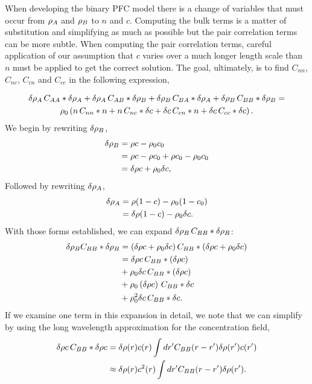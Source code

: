 When developing the binary PFC model there is a change of variables that must
occur from $\rho_A$ and $\rho_B$ to $n$ and $c$. Computing the bulk terms is a matter
of substitution and simplifying as much as possible but the pair correlation
terms can be more subtle. When computing the pair correlation terms, careful
application of our assumption that $c$ varies over a much longer length scale
than $n$ must be applied to get the correct solution. The goal, ultimately, is
to find $C_{n n}$, $C_{n c}$, $C_{c n}$ and $C_{c c}$ in the following
expression, 

\begin{gather}\label{1}
  \delta \rho_A \,C_{AA} \ast \delta \rho_A + \delta \rho_A \,C_{AB} \ast \delta \rho_B + \delta \rho_B \,C_{BA} \ast \delta \rho_A + \delta \rho_B \,C_{BB} \ast \delta \rho_B = \\ \nonumber
  \rho_0 \left(n \,C_{nn} \ast n + n \,C_{nc} \ast \delta c + \delta c \,C_{cn}\ast n + \delta c \,C_{cc} \ast \delta c\right).
\end{gather}
We begin by rewriting $\delta \rho_B$,
%
\begin{align*}
  \delta \rho_B &= \rho c - \rho_0 c_0 \\
        &= \rho c - \rho c_0 + \rho c_0 - \rho_0 c_0 \\
        &= \delta \rho c + \rho_0 \delta c,
\end{align*}
%
Followed by rewriting $\delta \rho_A$,
%
\begin{align*}
  \delta \rho_A &= \rho (1 - c) - \rho_0 (1 - c_0) \\
        &= \delta \rho (1 - c) - \rho_0 \delta c.
\end{align*}
%
With those forms established, we can expand $\delta \rho_B \,C_{BB} \ast \delta \rho_B$:
%
\begin{align}\label{this}
  \delta \rho_B C_{BB} \ast \delta \rho_B &= \left(\delta \rho c + \rho_0 \delta c \right) C_{BB} \ast \left(\delta \rho c + \rho_0 \delta c\right) \nonumber\\
                          &= \delta \rho c \,C_{BB} \ast \left( \delta \rho c\right) \nonumber\\
                          &+ \rho_0 \delta c \,C_{BB} \ast \left( \delta \rho c \right) \\
                          &+ \rho_0 \left(\delta \rho c\right) \,C_{BB} \ast \delta c \nonumber\\
                          &+ \rho_0^2 \delta c \,C_{BB} \ast \delta c. \nonumber
\end{align}
%
If we examine one term in this expansion in detail, we note that we can
simplify by using the long wavelength approximation for the concentration
field,
%
\begin{align}
  \delta \rho c \, C_{BB} \ast \delta \rho c &= \delta \rho(r) c(r) \int dr^\prime C_{BB}(r - r^\prime) \delta \rho(r^\prime) c(r^\prime) \nonumber \\
                                     &\approx \delta \rho(r) c^2(r) \int dr^\prime C_{BB}(r - r^\prime) \delta \rho(r^\prime).
\end{align}
